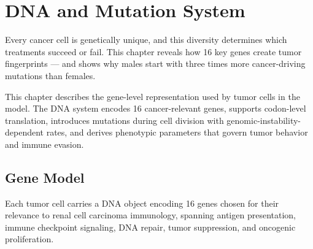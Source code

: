 \chapter{DNA and Mutation System}
\label{ch:dna}

Every cancer cell is genetically unique, and this diversity determines which treatments succeed or fail. This chapter reveals how 16 key genes create tumor fingerprints --- and shows why males start with three times more cancer-driving mutations than females.

This chapter describes the gene-level representation used by tumor cells in the model. The DNA system encodes 16 cancer-relevant genes, supports codon-level translation, introduces mutations during cell division with genomic-instability-dependent rates, and derives phenotypic parameters that govern tumor behavior and immune evasion.

\section{Gene Model}
\label{sec:gene-model}

Each tumor cell carries a DNA object encoding 16 genes chosen for their relevance to renal cell carcinoma immunology, spanning antigen presentation, immune checkpoint signaling, DNA repair, tumor suppression, and oncogenic proliferation.


